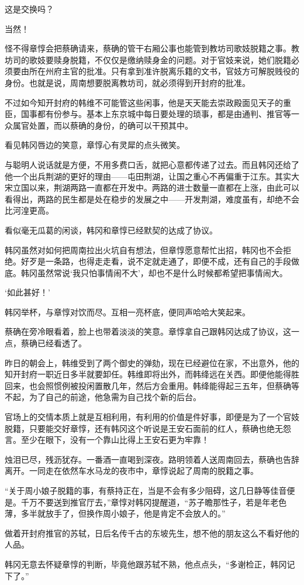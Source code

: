 这是交换吗？

当然！

怪不得章惇会把蔡确请来，蔡确的管干右厢公事也能管到教坊司歌妓脱籍之事。教坊司的歌妓要赎身脱籍，不仅仅是缴纳赎身金的问题。对于官妓来说，她们脱籍必须要由所在州府主官的批准。只有拿到准许脱离乐籍的文书，官妓方可解脱贱役的身份。也就是说，周南想要脱离教坊司，就必须得到开封府的批准。

不过如今知开封府的韩维不可能管这些闲事，他是天天能去崇政殿面见天子的重臣，国事都有份参与。基本上东京城中每日要处理的琐事，都是由通判、推官等一众属官处置，而以蔡确的身份，的确可以干预其中。

看见韩冈唇边的笑意，章惇心有灵犀的点头微笑。

与聪明人说话就是方便，不用多费口舌，就把心意都传递了过去。而且韩冈还给了他一个出兵荆湖的更好的理由——屯田荆湖，让国之重心不再偏重于江东。其实大宋立国以来，荆湖两路一直都在开发中。两路的进士数量一直都在上涨，由此可以看得出，两路的民生都是处在稳步的发展之中——开发荆湖，难度虽有，却绝不会比河湟更高。

看似毫无瓜葛的闲谈，韩冈和章惇已经默契的达成了协议。

韩冈虽然对如何把周南拉出火坑自有想法，但章惇愿意帮忙出招，韩冈也不会拒绝。好歹是一条路，也得走走看，说不定就走通了，即便不成，还有自己的手段做底。韩冈虽然常说‘我只怕事情闹不大’，却也不是什么时候都希望把事情闹大。

‘如此甚好！’

韩冈举杯，与章惇对饮而尽。互相一亮杯底，便同声哈哈大笑起来。

蔡确在旁冷眼看着，脸上也带着淡淡的笑意。章惇拿自己跟韩冈达成了协议，这一点，蔡确已经看透了。

昨日的朝会上，韩维受到了两个御史的弹劾，现在已经避位在家，不出意外，他的知开封府一职近日多半就要卸任。韩维即将出外，而韩绛远在关西。即便他能得胜回来，也会照惯例被投闲置散几年，然后方会重用。韩绛能得起三五年，但蔡确等不起，为了自己的前途，他急需为自己找个新的后台。

官场上的交情本质上就是互相利用，有利用的价值是件好事，即便是为了一个官妓脱籍，只要能交好章惇，还有韩冈这个听说是王安石面前的红人，蔡确也绝无怨言。至少在眼下，没有一个靠山比得上王安石更为牢靠！

烛泪已尽，残沥犹存。一番酒一直喝到深夜。路明领着人送周南回去，蔡确也告辞离开。一同走在依然车水马龙的夜市中，章惇说起了周南的脱籍之事。

“关于周小娘子脱籍的事，有蔡持正在，当是不会有多少阻碍，这几日静等佳音便是。千万不要送到推官厅去，”章惇对韩冈提醒道，“苏子瞻那性子，若是年老色薄，多半就放手了，但换作周小娘子，他是肯定不会放人的。”

做着开封府推官的苏轼，日后名传千古的东坡先生，想不他的朋友这么不看好他的人品。

韩冈无意去怀疑章惇的判断，毕竟他跟苏轼不熟，他点点头，“多谢检正，韩冈记下了。”

